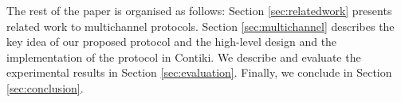 





The rest of the paper is organised as follows: Section \ref{sec:relatedwork} presents related work to multichannel protocols. Section \ref{sec:multichannel} describes the key idea of our proposed protocol and the high-level design and the implementation of the protocol in Contiki. We describe and evaluate the experimental results in Section \ref{sec:evaluation}. Finally, we conclude in Section \ref{sec:conclusion}.
